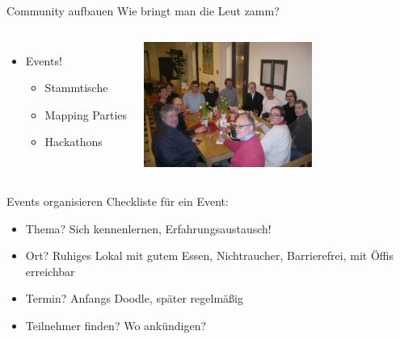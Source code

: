 \documentclass{beamer}
\begin{document}
\begin{frame}{Community aufbauen}
	Wie bringt man die Leut zamm?
	\pause

	\begin{columns}[c] %
	\begin{itemize}
		\item Events!
\vspace{4mm}
		\begin{itemize}
			  \item Stammtische
				\vspace{3mm}
			  \item Mapping Parties
				  \vspace{3mm}
			  \item Hackathons
		\end{itemize}
	\end{itemize}
	\includegraphics[width=5.5cm]{Salzburg_stammtisch.jpg}
\end{columns}

\end{frame}

\begin{frame}{Events organisieren}
	Checkliste für ein Event:
				  \vspace{3mm}
	\begin{itemize}
		\item Thema? Sich kennenlernen, Erfahrungsaustausch!
		\item Ort? Ruhiges Lokal mit gutem Essen, Nichtraucher, Barrierefrei, mit Öffis erreichbar
		\item Termin? Anfangs Doodle, später regelmäßig
		\item Teilnehmer finden? Wo ankündigen?
	\end{itemize}
\end{frame}
\end{document}
